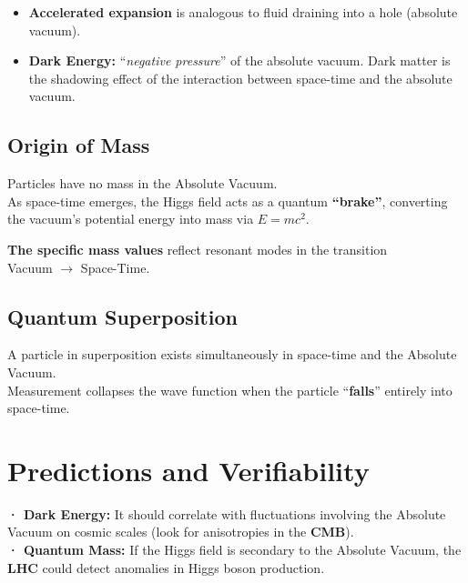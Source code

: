 \documentclass[a4paper]{article}
\theoremstyle{definition}
\theoremstyle{remark}
\numberwithin{equation}{section}
\begin{document}
\begin{itemize}
	\item \textbf{Accelerated expansion} is analogous to fluid draining into a hole (absolute vacuum).
	\item \textbf{Dark Energy:} ``\textit{negative pressure}'' of the absolute vacuum.
	Dark matter is the shadowing effect of the interaction between space-time and the absolute vacuum.
\end{itemize}

	
	\subsection{Origin of Mass}
	
\begin{flushleft}
	Particles have no mass in the Absolute Vacuum.\\
	As space-time emerges, the Higgs field acts as a quantum \textbf{``brake''}, converting the vacuum's potential energy into mass via \( E = mc^2 \).\\
	
	\item \textbf{The specific mass values} reflect resonant modes in the transition\\
	Vacuum \(\rightarrow\) Space-Time.
\end{flushleft}

	
\subsection{Quantum Superposition}

\begin{flushleft}
	A particle in superposition exists simultaneously in space-time and the Absolute Vacuum.\\
	Measurement collapses the wave function when the particle ``\textbf{falls}'' entirely into space-time.
\end{flushleft}

\section{Predictions and Verifiability}

\textbf{· Dark Energy:} It should correlate with fluctuations involving the Absolute Vacuum on cosmic scales (look for anisotropies in the \textbf{CMB}).\\

\textbf{· Quantum Mass:} If the Higgs field is secondary to the Absolute Vacuum, the \textbf{LHC} could detect anomalies in Higgs boson production.\\
\end{document}

